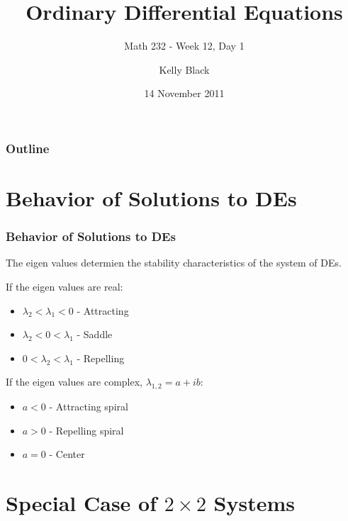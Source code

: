 
\title{Ordinary Differential Equations}
\subtitle{Math 232 - Week 12, Day 1}

\author{Kelly Black}
\date{14 November 2011}

\begin{frame}
  \titlepage
\end{frame}

\begin{frame}
  \frametitle{Outline}
\end{frame}


\section{Behavior of Solutions to DEs}


\begin{frame}
  \frametitle{Behavior of Solutions to DEs}

  The eigen values determien the stability characteristics of the
  system of DEs.

  If the eigen values are real:
  \begin{itemize}
  \item $\lambda_2 < \lambda_1 < 0$ - Attracting
  \item $\lambda_2 < 0 < \lambda_1$ - Saddle
  \item $0 < \lambda_2 < \lambda_1$ - Repelling
  \end{itemize}

  If the eigen values are complex, $\lambda_{1,2}=a+ib$:
  \begin{itemize}
  \item $a<0$ - Attracting spiral
  \item $a>0$ - Repelling spiral
  \item $a=0$ - Center
  \end{itemize}

\end{frame}

\section{Special Case of $2\times 2$ Systems}

